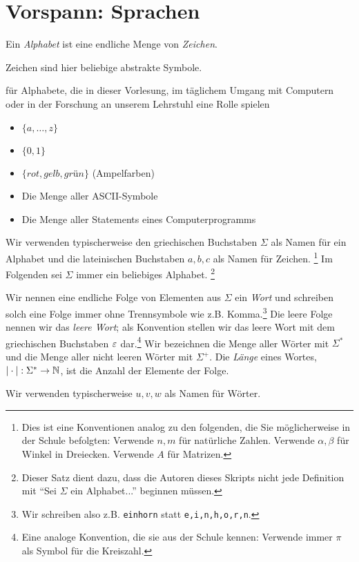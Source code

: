 \section[Vorspann: Sprachen]{Vorspann: Sprachen}
\begin{Def}[name={[Alphabet $\Sigma$]}]
	Ein \emph{Alphabet} ist eine endliche Menge von \emph{Zeichen}.
\end{Def} %
Zeichen sind hier beliebige abstrakte Symbole.

\newcommand{\aro}{\textit{rot}}
\newcommand{\age}{\textit{gelb}}
\newcommand{\agr}{\textit{grün}}

\begin{Bsp*} für Alphabete, die in dieser Vorlesung, im täglichem Umgang mit Computern oder in der Forschung an unserem Lehrstuhl eine Rolle spielen
  \begin{itemize}
  \item $\{a,\dots,z\}$
  \item $\{0, 1\}$
  \item $\{\aro, \age, \agr\}$ (Ampelfarben)
  \item Die Menge aller ASCII-Symbole
  \item Die Menge aller Statements eines Computerprogramms
  \qedhere
  \end{itemize}
\end{Bsp*}
Wir verwenden typischerweise den griechischen Buchstaben $\Sigma$ als Namen für ein Alphabet und die lateinischen Buchstaben $a,b,c$ als Namen für Zeichen.%
\footnote{Dies ist eine Konventionen analog zu den folgenden, die Sie möglicherweise in der Schule befolgten: Verwende $n,m$ für natürliche Zahlen. Verwende $\alpha, \beta$ für Winkel in Dreiecken. Verwende $A$ für Matrizen.}
Im Folgenden sei $\Sigma$ immer ein beliebiges Alphabet.%
\footnote{Dieser Satz dient dazu, dass die Autoren dieses Skripts nicht jede Definition mit ``Sei $\Sigma$ ein Alphabet...'' beginnen müssen.}

\begin{Def}[name={[Wort $w$ über $\Sigma$]}]\label{def:1.2}
  Wir nennen eine endliche Folge von Elementen aus $\Sigma$ ein \emph{Wort}
  und schreiben solch eine Folge immer ohne Trennsymbole wie z.B. Komma.\footnote{Wir schreiben also z.B. \texttt{einhorn} statt \texttt{e,i,n,h,o,r,n}.}
  Die leere Folge nennen wir das \emph{leere Wort}; als Konvention stellen wir das leere Wort mit dem griechischen Buchstaben $\varepsilon$ dar.\footnote{Eine analoge Konvention, die sie aus der Schule kennen: Verwende immer $\pi$ als Symbol für die Kreiszahl.}
  Wir bezeichnen die Menge aller Wörter mit $\Sigma^*$ und die Menge aller nicht leeren Wörter mit $\Sigma^+$.
  Die \emph{Länge} eines Wortes, $|\cdot| : \Sigma^* \to \mathbb{N}$, ist die Anzahl der Elemente der Folge.
\end{Def}
  Wir verwenden typischerweise $u,v,w$ als Namen für Wörter.

